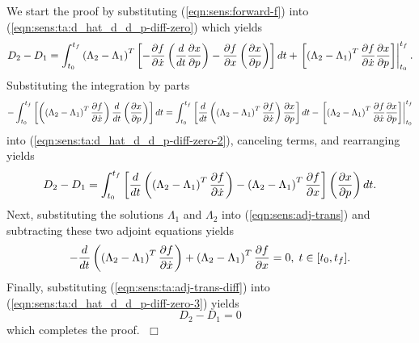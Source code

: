 \documentclass[pdf,ps2pdf,11pt]{SANDreport}
\begin{document}
We start the proof by substituting (\ref{eqn:sens:forward-f}) into
(\ref{eqn:sens:ta:d_hat_d_d_p-diff-zero}) which yields
%
\begin{equation}
D_2 - D_1 = 
\int_{t_0}^{t_f} \left( \Lambda_2 - \Lambda_1 \right)^T \left[
  - \displaystyle{\frac{\partial f}{\partial \dot{x}}} \left(\frac{d}{dt} \displaystyle{\frac{\partial x}{\partial p}} \right) - \displaystyle{\frac{\partial f}{\partial x}} \left(\displaystyle{\frac{\partial x}{\partial p}}\right) \right] dt
+ \left.\left[ \left( \Lambda_2 - \Lambda_1 \right)^T \displaystyle{\frac{\partial f}{\partial \dot{x}}} \displaystyle{\frac{\partial x}{\partial p}} \right]\right|_{t_0}^{t_f}.
\label{eqn:sens:ta:d_hat_d_d_p-diff-zero-2}
\end{equation}
%
Substituting the integration by parts
%
\[
- \int_{t_0}^{t_f} \left[ \left( \left( \Lambda_2 - \Lambda_1 \right)^T \displaystyle{\frac{\partial f}{\partial \dot{x}}} \right) \frac{d}{dt}\left( \displaystyle{\frac{\partial x}{\partial p}} \right) \right] dt
= \int_{t_0}^{t_f} \left[ \frac{d}{dt}\left( \left( \Lambda_2 - \Lambda_1 \right)^T  \displaystyle{\frac{\partial f}{\partial \dot{x}}} \right) \displaystyle{\frac{\partial x}{\partial p}} \right] dt
- \left. \left[ \left( \Lambda_2 - \Lambda_1 \right)^T  \displaystyle{\frac{\partial f}{\partial \dot{x}}} \displaystyle{\frac{\partial x}{\partial p}} \right] \right|_{t_0}^{t_f}
\]
%
into (\ref{eqn:sens:ta:d_hat_d_d_p-diff-zero-2}), canceling
terms, and rearranging yields
%
\begin{equation}
D_2 - D_1 = 
\int_{t_0}^{t_f} \left[ \frac{d}{dt} \left( \left( \Lambda_2 - \Lambda_1 \right)^T \displaystyle{\frac{\partial f}{\partial \dot{x}}} \right)
- \left( \Lambda_2 - \Lambda_1 \right)^T \displaystyle{\frac{\partial f}{\partial x}} \right] \left(\displaystyle{\frac{\partial x}{\partial p}}\right) dt.
\label{eqn:sens:ta:d_hat_d_d_p-diff-zero-3}
\end{equation}
%
Next, substituting the solutions $\Lambda_1$ and $\Lambda_2$ into
(\ref{eqn:sens:adj-trans}) and subtracting these two adjoint
equations yields
%
\begin{equation}
- \frac{d}{dt} \left( \left( \Lambda_2 - \Lambda_1 \right)^T \displaystyle{\frac{\partial f}{\partial \dot{x}}} \right)
+ \left( \Lambda_2 - \Lambda_1 \right)^T \displaystyle{\frac{\partial f}{\partial x}} = 0, \; t \in [t_0,t_f].
\label{eqn:sens:ta:adj-trans-diff}
\end{equation}
%
Finally, substituting (\ref{eqn:sens:ta:adj-trans-diff}) into
(\ref{eqn:sens:ta:d_hat_d_d_p-diff-zero-3}) yields
%
\begin{equation}
D_2 - D_1 = 0
\label{eqn:sens:ta:d_hat_d_d_p-diff-zero-final}
\end{equation}
%
which completes the proof. $\;\Box$
\end{document}

